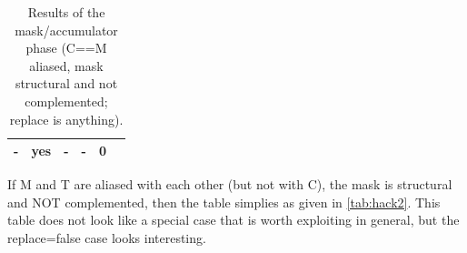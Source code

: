 \begin{table}
{\begin{tabular}{lllll|l}
    -  &yes &  -       &  -        & 0    &   \\
\hline
\hline
\end{tabular}
}
\caption{Results of the mask/accumulator phase (C==M aliased, mask structural and
not complemented; replace is anything). \label{tab:hack1} }
\end{table}

\newpage
If M and T are aliased with each other (but not with C), 
the mask is structural and NOT complemented, then
the table simplies as given in \ref{tab:hack2}.
This table does not look like a special case that is worth exploiting in general,
but the replace=false case looks interesting.

